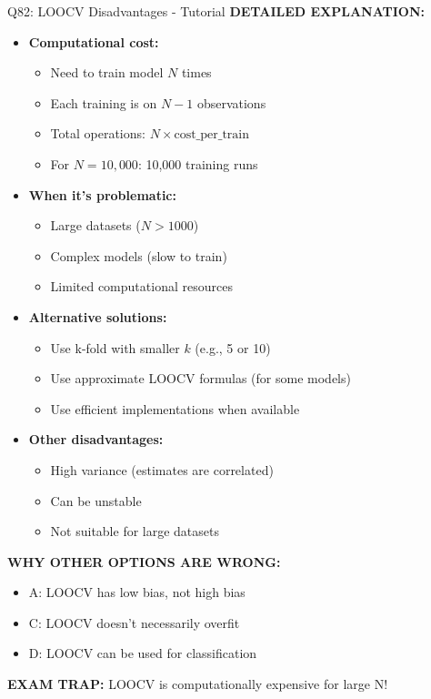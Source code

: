 \documentclass[8pt]{beamer}
\begin{document}
\begin{frame}{Q82: LOOCV Disadvantages - Tutorial}
		\vspace{0.05cm}
		\textbf{DETAILED EXPLANATION:}
		\begin{itemize}
			\item \textbf{Computational cost:}
			\begin{itemize}
				\item Need to train model $N$ times
				\item Each training is on $N-1$ observations
				\item Total operations: $N \times \text{cost\_per\_train}$
				\item For $N = 10,000$: 10,000 training runs
			\end{itemize}
			\item \textbf{When it's problematic:}
			\begin{itemize}
				\item Large datasets ($N > 1000$)
				\item Complex models (slow to train)
				\item Limited computational resources
			\end{itemize}
			\item \textbf{Alternative solutions:}
			\begin{itemize}
				\item Use k-fold with smaller $k$ (e.g., 5 or 10)
				\item Use approximate LOOCV formulas (for some models)
				\item Use efficient implementations when available
			\end{itemize}
			\item \textbf{Other disadvantages:}
			\begin{itemize}
				\item High variance (estimates are correlated)
				\item Can be unstable
				\item Not suitable for large datasets
			\end{itemize}
		\end{itemize}
		
		\vspace{0.05cm}
		\textcolor{myred}{\textbf{WHY OTHER OPTIONS ARE WRONG:}}
		\begin{itemize}
			\item \textcolor{myred}{A:} LOOCV has low bias, not high bias
			\item \textcolor{myred}{C:} LOOCV doesn't necessarily overfit
			\item \textcolor{myred}{D:} LOOCV can be used for classification
		\end{itemize}
		
		\textcolor{myred}{\textbf{EXAM TRAP:}} LOOCV is computationally expensive for large N!
	\end{frame}
	
\end{document}

